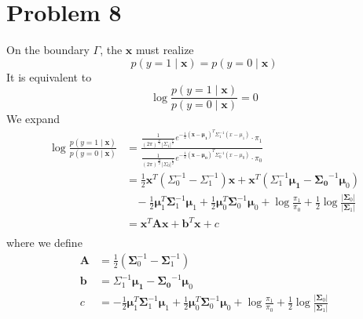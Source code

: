 \documentclass[12pt]{scrartcl}
\newcommand{\vect}[1]{\boldsymbol{#1}}
\newcommand{\ve}{\vect}
\begin{document}
  \section*{Problem 8}
  On the boundary $\Gamma$, the $\ve{x}$ must realize \[
  p\left( y = 1 \mid \ve{x} \right) = p \left( y = 0 \mid \ve{x} \right) 
  \]
  It is equivalent to \[
  \log \frac{p\left( y = 1 \mid \ve{x} \right) }{p\left( y = 0 \mid  \ve{x} \right) } = 0
  \] 
  We expand \[
  \begin{split}
      \log \frac{p\left( y = 1 \mid \ve{x} \right) }{p\left( y = 0 \mid  \ve{x} \right) } &= 
      \frac{\frac{1}{\left( 2\pi \right) ^{\frac{D}{2}} \left| \Sigma_1 \right|^{\frac{1}{2}}}e^{-\frac{1}{2}\left( \ve{x} - \ve{\mu_1} \right) ^{T}\Sigma_1^{-1}\left( x - \mu_1 \right) } \cdot \pi_1 }{\frac{1}{\left( 2\pi \right) ^{\frac{D}{2}} \left| \Sigma_0 \right|^{\frac{1}{2}}}e^{-\frac{1}{2}\left( \ve{x} - \ve{\mu_0} \right) ^{T}\Sigma_0^{-1}\left( x - \mu_0 \right) } \cdot \pi_0 }\\
      &= \frac{1}{2}\ve{x}^{T}\left( \Sigma_0^{-1} - \Sigma_1^{-1} \right)\ve{x}
      + \ve{x}^{T}\left( \Sigma_1^{-1}\ve{\mu_1} - \ve{\Sigma_0}^{-1}\ve{\mu}_0 \right) \\
      &\ \ \ \ - \frac{1}{2} \ve{\mu}_1^{T}\ve{\Sigma}_1^{-1}\ve{\mu}_1 + \frac{1}{2} \ve{\mu}_0^{T}\ve{\Sigma}_0^{-1}\ve{\mu}_0 
      + \log \frac{\pi_1}{\pi_0} + \frac{1}{2} \log \frac{\left| \ve{\Sigma}_0 \right| }{\left|\ve{\Sigma}_1\right|} \\
      &= \ve{x}^T \ve{A}\ve{x} + \ve{b}^T\ve{x} + c \\
  \end{split}
  \]  
  where we define \[
  \begin{split}
      \ve{A} &= \frac{1}{2}\left( \ve{\Sigma}_0^{-1} -\ve{ \Sigma}_1^{-1} \right) \\
      \ve{b} &=  \Sigma_1^{-1}\ve{\mu_1} - \ve{\Sigma_0}^{-1}\ve{\mu}_0\\
      c &=  - \frac{1}{2} \ve{\mu}_1^{T}\ve{\Sigma}_1^{-1}\ve{\mu}_1 + \frac{1}{2} \ve{\mu}_0^{T}\ve{\Sigma}_0^{-1}\ve{\mu}_0 
          + \log \frac{\pi_1}{\pi_0} + \frac{1}{2} \log \frac{\left| \ve{\Sigma}_0 \right| }{\left|\ve{\Sigma}_1\right|} \\
  \end{split}
  \] 


  

 
\end{document}
